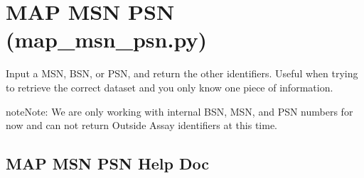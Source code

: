 \documentclass[letterpaper,10pt,english]{sphinxmanual}
\begin{document}
\section{MAP MSN PSN (map\_msn\_psn.py)}
\label{\detokenize{helper_scripts:map-msn-psn-map-msn-psn-py}}
Input a MSN, BSN, or PSN, and return the other identifiers. Useful when trying
to retrieve the correct dataset and you only know one piece of information.

\begin{sphinxadmonition}{note}{Note:}
We are only working with internal BSN, MSN, and PSN numbers for now and
can not return Outside Assay identifiers at this time.
\end{sphinxadmonition}


\subsection{MAP MSN PSN Help Doc}
\label{\detokenize{helper_scripts:map-msn-psn-help-doc}}
%
\end{document}
